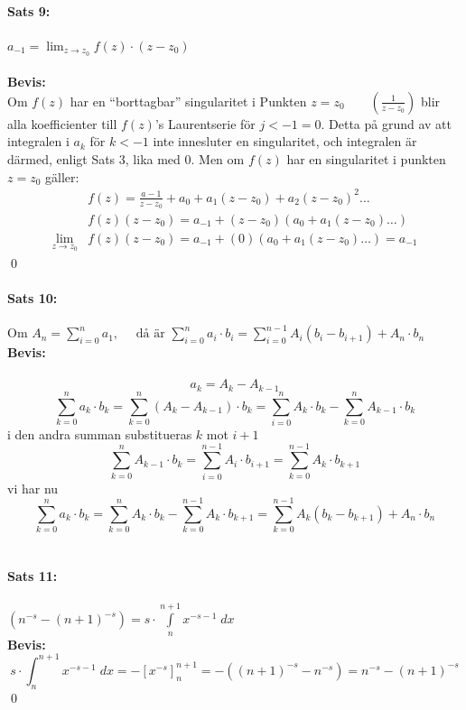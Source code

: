 \paragraph{Sats 9:} $a_{-1} = \lim_{z \to z_0} f(z) \cdot (z - z_0)$\\
\\
{\bf Bevis:}\\
Om $f(z)$ har en ``borttagbar'' singularitet i Punkten $z = z_0 \qquad \left ( \frac {1} {z - z_0} \right )$ blir 
alla koefficienter till $f(z)$'s Laurentserie för $j < -1 = 0$. Detta på grund av att integralen i $a_k$ för $k < -1$
inte innesluter en singularitet, och integralen  är därmed, enligt Sats 3, lika med $0$.
Men om $f(z)$ har en singularitet i punkten $z = z_0$ gäller:
\begin{align*}
	&f(z) = \frac {a - 1} {z - z_0} + a_0 + a_1(z - z_0) + a_2(z - z_0)^2 \ldots \\
	&f(z) (z - z_0) = a_{-1} + (z - z_0)(a_0 + a_1 (z - z_0) \ldots ) \\
	\lim_{z \to z_0} &f(z)(z - z_0) = a_{- 1} + (0)(a_0 + a_1(z - z_0) \ldots ) = a_{-1}
\end{align*}
\hfill \qed
\\
\paragraph{Sats 10:} %
Om $A_n = \sum\limits_{i = 0}^n a_1, \quad \text{ då är } \sum\limits_{i = 0}^n a_i \cdot b_i = 
		\sum\limits_{i = 0}^{n - 1} A_i (b_i - b_{i + 1}) + A_n \cdot b_n$\\
{\bf Bevis:}\\
\\
\[ a_k = A_k - A_{k - 1} \]
\[
	\sum_{k = 0}^n a_k \cdot b_k =  \sum_{k = 0}^n (A_k - A_{k - 1}) \cdot b_k = \sum_{i = 0}^n A_k \cdot b_k - 
		\sum_{k = 0}^n A_{k - 1} \cdot b_k
\]
i den andra summan substitueras $k$ mot $i + 1$
\[
	\sum_{k = 0}^n A_{k - 1} \cdot b_k = \sum_{i = 0}^{n - 1} A_i \cdot b_{i + 1} = \sum_{k = 0}^{n - 1} A_k \cdot b_{k + 1}
\]
vi har nu
\[
	\sum_{k = 0}^n a_k \cdot b_k = \sum_{k = 0}^n A_k \cdot b_k - \sum_{k = 0}^{n - 1} A_k \cdot b_{k + 1} =
		\sum_{k = 0}^{n - 1} A_k (b_k - b_{k + 1}) + A_n \cdot b_n
\]
\\
\paragraph{Sats 11:} $(n^{-s} - (n + 1)^{-s}) = s \cdot \int\limits_n^{n + 1} x^{-s - 1} \; dx$\\
{\bf Bevis:}\\
\[
	s \cdot \int_n^{n + 1} x^{-s - 1} \; dx = - [ x^{-s} ]_n^{n + 1} = - ((n + 1)^{-s} - n^{-s})
		= n^{-s} -(n + 1)^{-s}
\]
\hfill \qed
\\
